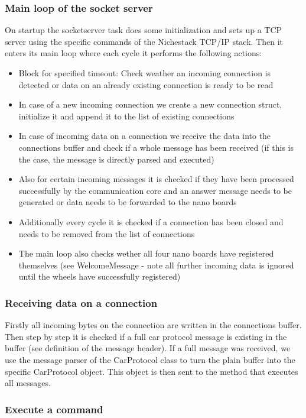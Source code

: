 \subsubsection{Main loop of the socket server}
On startup the socketserver task does some initialization and sets up a TCP server using the specific commands of the Nichestack TCP/IP stack.
Then it enters its main loop where each cycle it performs the following actions:
\begin{itemize}
	\item Block for specified timeout: Check weather an incoming connection is detected or data on an already existing connection is ready to be read
	\item In case of a new incoming connection we create a new connection struct, initialize it and append it to the list of existing connections
	\item In case of incoming data on a connection we receive the data into the connections buffer and check if a whole message has been received (if this is the case, the message is directly parsed and executed)
	\item Also for certain incoming messages it is checked if they have been processed successfully by the communication core and an answer message needs to be generated or data needs to be forwarded to the nano boards
	\item Additionally every cycle it is checked if a connection has been closed and needs to be removed from the list of connections
		\item The main loop also checks wether all four nano boards have registered themselves (see WelcomeMessage - note all further incoming data is ignored until the wheels have successfully registered)
\end{itemize}


\subsubsection{Receiving data on a connection}
Firstly all incoming bytes on the connection are written in the connections buffer. Then step by step it is checked if a full car protocol message 
is existing in the buffer (see definition of the message header). If a full message was received, we use the message parser of the CarProtocol class
to turn the plain buffer into the specific CarProtocol object. This object is then sent to the method that executes all messages.

\subsubsection{Execute a command}

